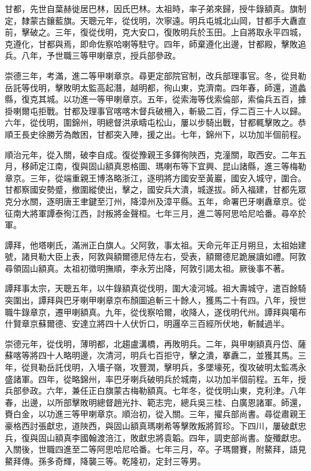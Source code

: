 \begin{pinyinscope}
甘都，先世自葉赫徙居巴林，因氏巴林。太祖時，率子弟來歸，授牛錄額真。旗制定，隸蒙古鑲藍旗。天聰元年，從伐明，次寧遠。明兵屯城北山岡，甘都手大纛直前，擊破之。三年，復從伐明，克大安口，復敗明兵於玉田。上自將取永平四城，克遵化，甘都與焉，即命佐察哈喇等駐守。四年，師棄遵化出邊，甘都殿，擊敗追兵。八年，予世職三等甲喇章京，授兵部參政。

崇德三年，考滿，進二等甲喇章京。尋更定部院官制，改兵部理事官。冬，從貝勒岳託等伐明，擊敗明太監高起潛，越明都，徇山東，克濟南。四年春，師還，道蠡縣，復克其城。以功進一等甲喇章京。五年，從索海等伐索倫部，索倫兵五百，據掛喇爾屯拒戰。甘都及理事官喀喀木督兵破柵入，斬級二百，俘二百三十人以歸。六年，從伐明，圍錦州，明總督洪承疇屯松山，屢以步騎出戰，甘都輒擊敗之。恭順王長史徐勝芳為敵困，甘都突入陣，援之出。七年，錦州下，以功加半個前程。

順治元年，從入關，破李自成。復從豫親王多鐸徇陜西，克潼關，取西安。二年五月，移師定江南，復與固山額真恩格圖、瑪喇布等下宜興、昆山諸縣，進三等梅勒章京。三年，從端重親王博洛略浙江，逐明將方國安至黃巖，國安入城守，圍合。甘都察國安勢蹙，撤圍縱使出，擊之，國安兵大潰，城遂拔。師入福建，甘都先眾克分水關，逐明唐王聿鍵至汀州，降漳州及漳平縣。五年，命署巴牙喇纛章京。從征南大將軍譚泰徇江西，討叛將金聲桓。七年三月，進二等阿思哈尼哈番。尋卒於軍。

譚拜，他塔喇氏，滿洲正白旗人。父阿敦，事太祖。天命元年正月朔旦，太祖始建號，諸貝勒大臣上表，阿敦與額爾德尼侍左右，受表，額爾德尼跪展讀如禮。阿敦尋領固山額真。太祖初徵明撫順，李永芳出降，阿敦引謁太祖。厥後事不著。

譚拜事太宗，天聰五年，以牛錄額真從伐明，圍大凌河城。祖大壽城守，遣百餘騎突圍出，譚拜與巴牙喇甲喇章京布顏圖追斬三十餘人，獲馬二十有四。八年，授世職牛錄章京，遷甲喇額真。九年，從伐察哈爾，收降人，遂伐明代州。譚拜與噶布什賢章京蘇爾德、安達立將四十人伏忻口，明邏卒三百經所伏地，斬馘過半。

崇德元年，從伐明，薄明都，北趨盧溝橋，再敗明兵。二年，與甲喇額真丹岱、薩蘇喀等將四十人略明邊，次清河，明兵七百拒守，擊之潰，搴纛二，並獲其馬。三年，從貝勒岳託伐明，入墻子嶺，攻豐潤，擊明兵，多墜壕死，復攻破明太監馮永盛諸軍。四年，從略錦州，率巴牙喇兵破明兵於城南，以功加半個前程。五年，授兵部參政。六年，兼任正白旗蒙古梅勒額真。七年冬，從伐明山東，克利津。八年春，出邊，以所部擊敗明總督趙光抃、範志完，總兵吳三桂、白廣恩諸軍。師還，賚白金，以功進三等甲喇章京。順治初，從入關。三年，擢兵部尚書。尋從肅親王豪格西討張獻忠，道陜西，與固山額真瑪喇希等擊敗叛將賀珍。下四川，屢破獻忠兵，復與固山額真李國翰渡涪江，敗獻忠將袁韜。四年，調吏部尚書。旋殲獻忠。入關後，世職四進至二等阿思哈尼哈番。七年三月，卒。子瑪爾賽，附鰲拜，語見鰲拜傳。孫多奇輝，降襲三等。乾隆初，定封三等男。


\end{pinyinscope}
